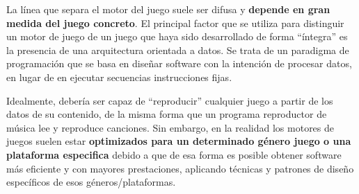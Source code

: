 La línea que separa el motor del juego suele ser difusa y \textbf{depende en gran medida del juego concreto}. El principal factor que se utiliza para distinguir un motor de juego de un juego que haya sido desarrollado de forma ``íntegra'' es la presencia de una arquitectura orientada a datos. Se trata de un paradigma de programación que se basa en diseñar software con la intención de procesar datos, en lugar de en ejecutar secuencias instrucciones fijas.

Idealmente, debería ser capaz de ``reproducir'' cualquier juego a partir de los datos de su contenido, de la misma forma que un programa reproductor de música lee y reproduce canciones. Sin embargo, en la realidad los motores de juegos suelen estar \textbf{optimizados para un determinado género juego o una plataforma especifica} debido a que de esa forma es posible obtener software más eficiente y con mayores prestaciones, aplicando técnicas y patrones de diseño específicos de esos géneros/plataformas.

